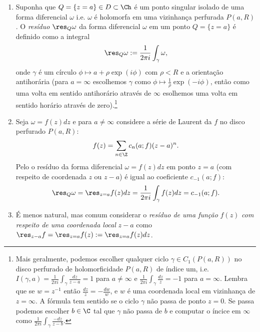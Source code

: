 \begin{defin}
\label{d:residuo}
\begin{enumerate}
\item Suponha que $Q = \{ z = a \} \in D \subset \Ch$ é um ponto singular isolado de uma forma diferencial $\omega$
i.e. $\omega$ é holomorfa em uma vizinhança perfurada $P(a,R)$.
O \emph{resíduo} $\res_Q \omega$ da forma diferencial $\omega$ em um ponto $Q = \{ z = a \}$
é definido como a integral
\begin{equation}
\res_Q \omega := \frac{1}{2\pi i} \int_\gamma \omega,
\end{equation}
onde $\gamma$ é um círculo $\phi \mapsto a + \rho \exp(i\phi)$ com $\rho<R$ e a orientação antihorária
(para $a=\infty$ escolhemos $\gamma$
como $\phi \mapsto \frac{1}{\rho} \exp(-i\phi)$,
então como uma volta em sentido antihorário através de $\infty$
esolhemos uma volta em sentido horário através de zero).\footnote{
Mais geralmente, podemos escolher qualquer ciclo $\gamma \in C_1(P(a,R))$
no disco perfurado de holomorficidade $P(a,R)$
de índice um, i.e.
$I(\gamma,a) = \frac{1}{2\pi i} \int_\gamma \frac{dz}{z-a} = 1$ para $a\neq\infty$
e $\frac{1}{2\pi i} \int_\gamma \frac{dz}{z} = -1$ para $a=\infty$. Lembra que
se $w=z^{-1}$ então $\frac{dz}{z} = -\frac{dw}{w}$,
e $w$ é uma coordenada local em vizinhança de $z=\infty$.
A fórmula tem sentido se o ciclo $\gamma$ não passa de ponto $z=0$.
Se passa podemos escolher $b\in\C$ tal que $\gamma$ não passa de $b$
e computar o íncice em $\infty$ como $\frac{1}{2\pi i} \int_\gamma \frac{-dz}{z-b}$.}
\item Seja $\omega = f(z) dz$ e para $a\neq\infty$
considere a série de Laurent da $f$ no disco perfurado $P(a,R)$:
\[ f(z) = \sum_{n\in\Z} c_n(a;f) (z-a)^n. \]
Pelo  o  resíduo da forma diferencial
$\omega = f(z) dz$ em ponto $z=a$ (com respeito de coordenada $z$ ou $z-a$)
é igual ao coeficiente $c_{-1}(a;f)$:
\begin{equation}
\res_Q \omega = \res_{z=a} f(z) dz =\frac{1}{2\pi i} \int_\gamma f(z) dz = c_{-1}(a;f).
\end{equation}
\item É menos natural, mas comum considerar o \emph{resíduo de uma função} $f(z)$
\emph{com respeito de uma coordenada local} $z-a$ como $\res_{z-a} f = \res_{z=a} f(z) := \res_{z=a} f(z) dz$.
\end{enumerate}
\end{defin}

